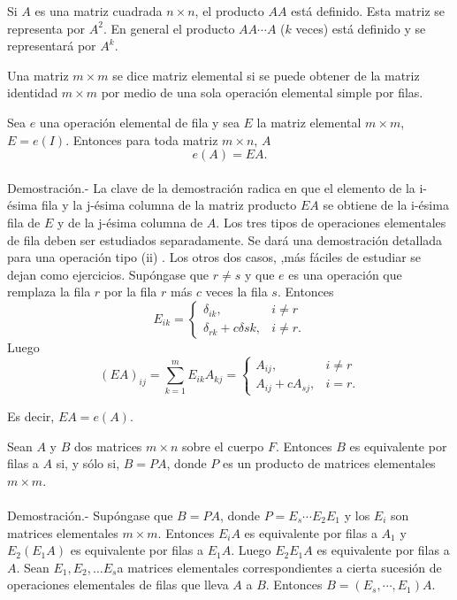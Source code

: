 Si $A$ es una matriz cuadrada $n\times n$, el producto $AA$ está definido. Esta matriz se representa por $A^2$. En general el producto $AA\cdots A$ ($k$ veces) está definido y se representará por $A^k$.

\begin{tcolorbox}
    \begin{def.}
	Una matriz $m\times m$ se dice matriz elemental si se puede obtener de la matriz identidad $m\times m$ por medio de una sola operación elemental simple por filas.
    \end{def.}
\end{tcolorbox}

\begin{teo}
    Sea $e$ una operación elemental de fila y sea $E$ la matriz elemental $m\times m$, $E=e(I)$. Entonces para toda matriz $m\times n$, $A$
    $$e(A)=EA.$$\\
	Demostración.-\; La clave de la demostración radica en que el elemento de la i-ésima fila y la j-ésima columna de la matriz producto $EA$ se obtiene de la i-ésima fila de $E$ y de la j-ésima columna de $A$. Los tres tipos de operaciones elementales de fila deben ser estudiados separadamente. Se dará una demostración detallada para una operación tipo (ii) . Los otros dos casos, ,más fáciles de estudiar se dejan como ejercicios. Supóngase que $r\neq s$ y que $e$ es una operación que remplaza la fila $r$ por la fila $r$ más $c$ veces la fila $s$. Entonces
	$$E_{ik}=\left\{\begin{array}{ll}
		\delta_{ik}, & i\neq r\\
		\delta_{rk} + c\delta sk, & i\neq r.
    \end{array}\right.$$
    Luego
    $$ (EA)_{ij}=\sum_{k=1}^m E_{ik}A_{kj} = \left\{\begin{array}{ll}
	    		A_{ij}, & i\neq r\\
			A_{ij} + cA_{sj}, & i=r.
    \end{array}\right.$$

    Es decir, $EA=e(A).$\\

\end{teo}

\begin{cor}
    Sean $A$ y $B$ dos matrices $m\times n$ sobre el cuerpo $F$. Entonces $B$ es equivalente por filas a $A$ si, y sólo si, $B=PA$, donde $P$ es un producto de matrices elementales $m\times m$.\\\\
	Demostración.-\; Supóngase que $B=PA$, donde $P=E_s\cdots E_2E_1$ y los $E_i$ son matrices elementales $m\times m$. Entonces $E_iA$ es equivalente por filas a $A_1$ y $E_2(E_1A)$ es equivalente por filas a $E_1A$. Luego $E_2E_1A$ es equivalente por filas a $A$. Sean $E_1,E_2,\ldots E_s$a matrices elementales correspondientes a cierta sucesión de operaciones elementales de filas que lleva $A$ a $B$. Entonces $B=(E_s,\cdots , E_1)A.$
\end{cor}


